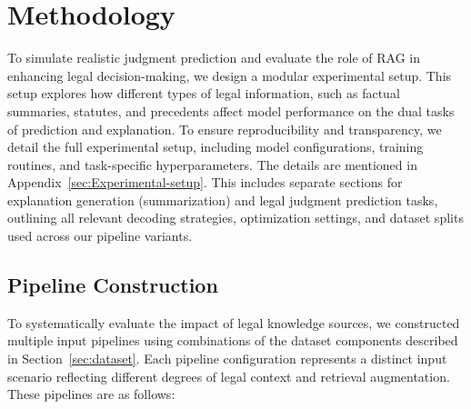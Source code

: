 \section{Methodology}
\label{sec:methodology}
To simulate realistic judgment prediction and evaluate the role of RAG in enhancing legal decision-making, we design a modular experimental setup. This setup explores how different types of legal information, such as factual summaries, statutes, and precedents affect model performance on the dual tasks of prediction and explanation. To ensure reproducibility and transparency, we detail the full experimental setup, including model configurations, training routines, and task-specific hyperparameters. The details are mentioned in Appendix~\ref{sec:Experimental-setup}. This includes separate sections for explanation generation (summarization) and legal judgment prediction tasks, outlining all relevant decoding strategies, optimization settings, and dataset splits used across our pipeline variants.

\subsection{Pipeline Construction}
To systematically evaluate the impact of legal knowledge sources, we constructed multiple input pipelines using combinations of the dataset components described in Section~\ref{sec:dataset}. Each pipeline configuration represents a distinct input scenario reflecting different degrees of legal context and retrieval augmentation. These pipelines are as follows:

